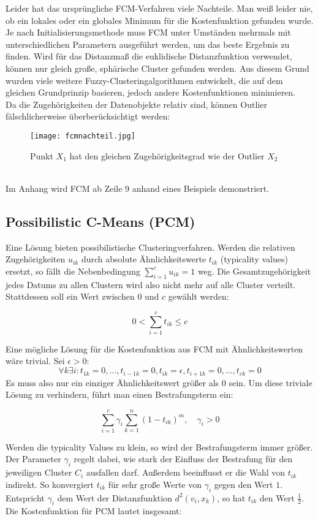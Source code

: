 \documentclass[11pt,ceqn]{book}
\begin{document}
Leider hat das ursprüngliche FCM-Verfahren viele Nachteile. Man weiß leider nie, ob ein lokales oder ein globales Minimum für die Kostenfunktion gefunden wurde. Je nach Initialisierungsmethode muss FCM unter Umständen mehrmals mit unterschiedlichen Parametern ausgeführt werden, um das beste Ergebnis zu finden. Wird für das Distanzmaß die euklidische Distanzfunktion verwendet, können nur gleich große, sphärische Cluster gefunden werden. Aus diesem Grund wurden viele weitere Fuzzy-Clusteringalgorithmen entwickelt, die auf dem gleichen Grundprinzip basieren, jedoch andere Kostenfunktionen minimieren.
\\
Da die Zugehörigkeiten der Datenobjekte relativ sind, können Outlier fälschlicherweise überberücksichtigt werden:

\begin{figure}[H]
\centering
\texttt{[image: fcmnachteil.jpg]}
 \caption{Punkt $X_1$ hat den gleichen Zugehörigkeitsgrad wie der Outlier $X_2$}
\end{figure}
~\\
Im Anhang wird FCM ab Zeile 9 anhand eines Beispiels demonstriert.

\subsection{Possibilistic C-Means (PCM)}
Eine Lösung bieten possibilistische Clusteringverfahren. Werden die relativen Zugehörigkeiten $u_{ik}$ durch absolute Ähnlichkeitswerte $t_{ik}$ (typicality values) ersetzt, so fällt die Nebenbedingung $\sum\limits_{i=1}^c u_{ik} = 1$ weg. Die Gesamtzugehörigkeit jedes Datums zu allen Clustern wird also nicht mehr auf alle Cluster verteilt. Stattdessen soll ein Wert zwischen $0$ und $c$ gewählt werden:

$$0 < \sum_{i=1}^c t_{ik} \leqslant c$$

Eine mögliche Lösung für die Kostenfunktion aus FCM mit Ähnlichkeitswerten wäre trivial. Sei $\epsilon>0$: 
$$\forall k \exists i: t_{1k}=0, \dots, t_{i-1k}=0, t_{ik} = \epsilon, t_{i+1k}=0, \dots, t_{ck}=0 $$
Es muss also nur ein einziger Ähnlichkeitswert größer als $0$ sein. Um diese triviale Lösung zu verhindern, führt man einen Bestrafungsterm ein:

$$\sum_{i=1}^c  \gamma_i \sum_{k=1}^n (1-t_{ik})^m, \quad \gamma_i >0$$

Werden die typicality Values zu klein, so wird der Bestrafungsterm immer größer. Der Parameter $\gamma_i$ regelt dabei, wie stark der Einfluss der Bestrafung für den jeweiligen Cluster $C_i$ ausfallen darf. Außerdem beeinflusst er die Wahl von $t_{ik}$ indirekt. So konvergiert $t_{ik}$ für sehr große Werte von $\gamma_i$ gegen den Wert $1$. Entspricht $\gamma_i$ dem Wert der Distanzfunktion $d^2 (v_i,x_k)$, so hat $t_{ik}$ den Wert $\frac{1}{2}$.
\\
Die Kostenfunktion für PCM lautet insgesamt:
\end{document}
